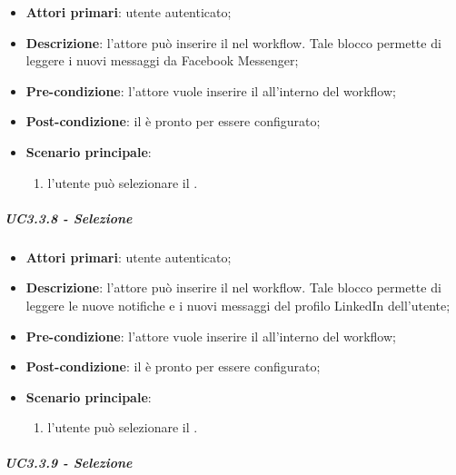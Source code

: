 \begin{itemize}
\item \textbf{Attori primari}: utente autenticato;

\item \textbf{Descrizione}:  l'attore può inserire il \BMessenger{} nel workflow. Tale blocco permette di leggere i nuovi messaggi da Facebook Messenger;

\item \textbf{Pre-condizione}: l'attore vuole inserire il \BMessenger{} all'interno del workflow;

\item \textbf{Post-condizione}: il \BMessenger{} è pronto per essere configurato;

\item \textbf{Scenario principale}:
\begin{enumerate}
\item l'utente può selezionare il \BMessenger{}.

\end{enumerate}
\end{itemize}

\subparagraph{UC3.3.8 - Selezione \BLinkedIn{}}

\begin{itemize}
\item \textbf{Attori primari}: utente autenticato;

\item \textbf{Descrizione}: l'attore può inserire il \BLinkedIn{} nel workflow. Tale blocco permette di leggere le nuove notifiche e i nuovi messaggi del profilo LinkedIn dell'utente;

\item \textbf{Pre-condizione}: l'attore vuole inserire il \BLinkedIn{} all'interno del workflow;

\item \textbf{Post-condizione}: il \BLinkedIn{} è pronto per essere configurato;

\item \textbf{Scenario principale}:
\begin{enumerate}
\item l'utente può selezionare il \BLinkedIn{}.

\end{enumerate}
\end{itemize}

\subparagraph{UC3.3.9 - Selezione \BSveglia{}}


